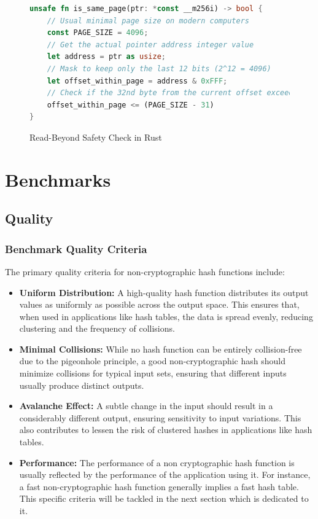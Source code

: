 \documentclass[10pt]{article}
\begin{document}
\begin{figure}[H]
\begin{lstlisting}[language=Rust, style=boxed]
unsafe fn is_same_page(ptr: *const __m256i) -> bool {
    // Usual minimal page size on modern computers
    const PAGE_SIZE = 4096;
    // Get the actual pointer address integer value
    let address = ptr as usize;
    // Mask to keep only the last 12 bits (2^12 = 4096)
    let offset_within_page = address & 0xFFF;
    // Check if the 32nd byte from the current offset exceeds the page boundary
    offset_within_page <= (PAGE_SIZE - 31)
}
\end{lstlisting}
\caption{Read-Beyond Safety Check in Rust}
\label{fig:check_page_example}
\end{figure}

\clearpage
\section{Benchmarks}

\subsection{Quality}

\subsubsection{Benchmark Quality Criteria}
The primary quality criteria for non-cryptographic hash functions include:

\begin{itemize}
    \item \textbf{Uniform Distribution:} A high-quality hash function distributes its output values as uniformly as possible across the output space. This ensures that, when used in applications like hash tables, the data is spread evenly, reducing clustering and the frequency of collisions.
    \item \textbf{Minimal Collisions:} While no hash function can be entirely collision-free due to the pigeonhole principle, a good non-cryptographic hash should minimize collisions for typical input sets, ensuring that different inputs usually produce distinct outputs.
    \item \textbf{Avalanche Effect:} A subtle change in the input should result in a considerably different output, ensuring sensitivity to input variations. This also contributes to lessen the risk of clustered hashes in applications like hash tables.
    \item \textbf{Performance:} The performance of a non cryptographic hash function is usually reflected by the performance of the application using it. For instance, a fast non-cryptographic hash function generally implies a fast hash table. This specific criteria will be tackled in the next section which is dedicated to it. 
\end{itemize}
\end{document}

